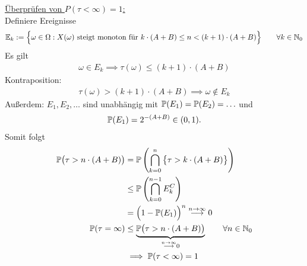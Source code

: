 \begin{beisp}
\underline{Überprüfen von $P(\tau<\infty)=1$:}\\
Definiere Ereignisse
\begin{align*}
\E_k:=\Big\lbrace\omega\in\Omega:X(\omega)\text{ steigt monoton für }k\cdot(A+B)\leq n<(k+1)\cdot(A+B)\Big\rbrace\qquad\forall k\in\N_0
\end{align*}
Es gilt
\begin{align*}
\omega\in E_k\implies \tau(\omega)\leq(k+1)\cdot(A+B)
\end{align*}
Kontraposition:
\begin{align*}
\tau(\omega)>(k+1)\cdot(A+B)\implies\omega\not\in E_k
\end{align*}
Außerdem: $E_1,E_2,\ldots$ sind unabhängig mit $\P(E_1)=\P(E_2)=\ldots$ und
\begin{align*}
\P(E_1)=2^{-(A+B)}\in(0,1).
\end{align*}
Somit folgt
\begin{align*}
\P\big(\tau>n\cdot(A+B)\big)&=\P\left(\bigcap\limits_{k=0}^n\big\lbrace\tau > k\cdot (A+B)\big\rbrace\right)\\
&\leq\P\left(\bigcap\limits_{k=0}^{n-1} E_k^C\right)\\
&=\Big(1-\P(E_1)\Big)^n\stackrel{n\to\infty}{\longrightarrow}0\\
\P(\tau=\infty)&\leq\underbrace{\P\big(\tau> n\cdot(A+B)\big)}_{\stackrel{n\to\infty}{\longrightarrow}0}\qquad\forall n\in\N_0\\
&\implies
\P(\tau<\infty)=1
\end{align*}

\end{beisp}


